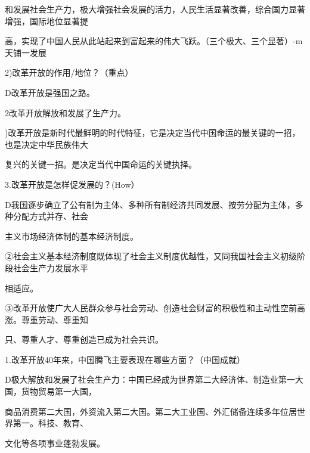 \documentclass[lang=cn,11pt]{elegantbook}
\newcommand{\daofasym}[1]{{\daofasymbolfont #1}}
\newcommand{\daofasym}[1]{#1}
\begin{document}
和发展社会生产力，极大增强社会发展的活力，人民生活显著改善，综合国力显著增强，国际地位显著提\par

高，实现了中国人民从此站起来到富起来的伟大飞跃。（三个极大、三个显著）-m天铺一发展\par

2)改革开放的作用/地位？（重点）\par

D改革开放是强国之路。\par

2改革开放解放和发展了生产力。\par

)改革开放是新时代最鲜明的时代特征，它是决定当代中国命运的最关键的一招，也是决定中华民族伟大\par

复兴的关键一招。是决定当代中国命运的关键执择。\par

3.改革开放是怎样促发展的？(How）\par

D我国逐步确立了公有制为主体、多种所有制经济共同发展、按劳分配为主体，多种分配方式并存、社会\par

主义市场经济体制的基本经济制度。\par

\daofasym{②}社会主义基本经济制度既体现了社会主义制度优越性，又同我国社会主义初级阶段社会生产力发展水平\par

相适应。\par

\daofasym{③}改革开放使广大人民群众参与社会劳动、创造社会财富的积极性和主动性空前高涨。尊重劳动、尊重知\par

只、尊重人才、尊重创造已成为社会共识。\par

1.改革开放40年来，中国腾飞主要表现在哪些方面？（中国成就）\par

D极大解放和发展了社会生产力：中国已经成为世界第二大经济体、制造业第一大国，货物贸易第一大国，\par

商品消费第二大国，外资流入第二大国。第二大工业国、外汇储备连续多年位居世界第一。科技、教育、\par

文化等各项事业蓬勃发展。\par
\end{document}
